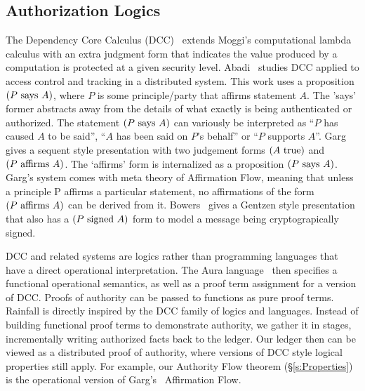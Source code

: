 \subsection{Authorization Logics}
The Dependency Core Calculus (DCC)~\cite{Abadi1999:DCC} extends Moggi's computational lambda calculus with an extra judgment form that indicates the value produced by a computation is protected at a given security level. Abadi~\cite{Abadi2007:AccessControl} studies DCC applied to access control and tracking in a distributed system. This work uses a proposition $(P~\textrm{says}~A)$, where $P$ is some principle/party that affirms statement $A$. The 'says' former abstracts away from the details of what exactly is being authenticated or authorized. The statement $(P~\textrm{says}~A)$ can variously be interpreted as ``$P$ has caused $A$ to be said'', ``$A$ has been said on $P$'s behalf'' or ``$P$ supports $A$''. Garg~\cite{Garg2006:Constructive} gives a sequent style presentation with two judgement forms $(A~\textrm{true})$ and $(P~\textrm{affirms}~A)$. The `affirms' form is internalized as a proposition $(P~\textrm{says}~A)$. Garg's system comes with meta theory of Affirmation Flow, meaning that unless a principle P affirms a particular statement, no affirmations of the form $(P~\textrm{affirms}~A)$ can be derived from it. Bowers~\cite{Bowers2007:Consumable} gives a Gentzen style presentation that also has a $(P~\textrm{signed}~A)$ form to model a message being cryptograpically signed.

DCC and related systems are logics rather than programming languages that have a direct operational interpretation. The Aura language~\cite{Jia2008:Aura} then specifies a functional operational semantics, as well as a proof term assignment for a version of DCC. Proofs of authority can be passed to functions as pure proof terms. Rainfall is directly inspired by the DCC family of logics and languages. Instead of building functional proof terms to demonstrate authority, we gather it in stages, incrementally writing authorized facts back to the ledger. Our ledger then can be viewed as a distributed proof of authority, where versions of DCC style logical properties still apply. For example, our Authority Flow theorem (\S\ref{s:Properties}) is the operational version of Garg's~\cite{Garg2006:Constructive} Affirmation Flow.





